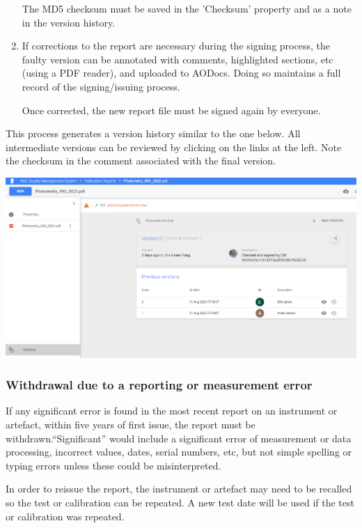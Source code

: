 \begin{enumerate}
The MD5 checksum must be saved in the 'Checksum' property and as a note in the version history. 

\item If corrections to the report are necessary during the signing process, the faulty version can be annotated with comments, highlighted sections, etc (using a PDF reader), and uploaded to AODocs. Doing so maintains a full record of the signing/issuing process. 

Once corrected, the new report file must be signed again by everyone.
\end{enumerate}

This process generates a version history similar to the one below. All intermediate versions can be reviewed by clicking on the links at the left. Note the checksum in the comment associated with the final version.

\begin{center}
\includegraphics[scale=.45]{pictures/version_history_report}
\end{center}

\subsubsection{Withdrawal due to a reporting or measurement error}
\label{sss:reissue_report}
If any significant error is found in the most recent report on an instrument or artefact, within five years of first issue, the report must be withdrawn.``Significant'' would include a significant error of measurement or data processing, incorrect values, dates, serial numbers, etc, but not simple spelling or typing errors unless these could be misinterpreted.

In order to reissue the report, the instrument or artefact may need to be recalled so the test or calibration can be repeated. A new test date will be used if the test or calibration was repeated.

